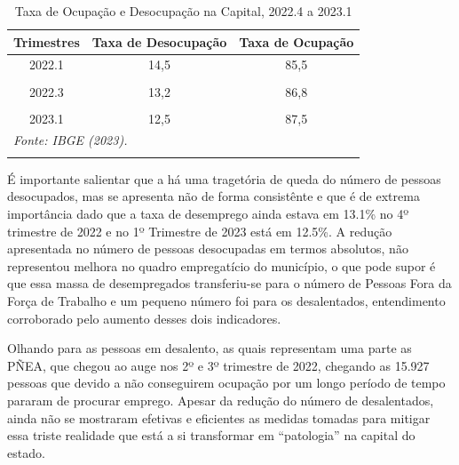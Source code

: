 \documentclass[
  12pt,
  a4paper,
]{article}
\begin{document}
\begin{longtable}[t]{ccc}
\caption{\label{tab:tab13}\label{tab13}Taxa de Ocupação e Desocupação na Capital, 2022.4 a 2023.1}\\
\toprule
Trimestres & Taxa de Desocupação & Taxa de Ocupação\\
\midrule
2022.1 & 14,5 & 85,5\\
\cellcolor[HTML]{DCDCDC}{2022.2} & \cellcolor[HTML]{DCDCDC}{13,2} & \cellcolor[HTML]{DCDCDC}{86,8}\\
2022.3 & 13,2 & 86,8\\
\cellcolor[HTML]{DCDCDC}{2022.4} & \cellcolor[HTML]{DCDCDC}{13,1} & \cellcolor[HTML]{DCDCDC}{86,9}\\
2023.1 & 12,5 & 87,5\\
\bottomrule
\multicolumn{3}{l}{\rule{0pt}{1em}\textit{Fonte: IBGE (2023).}}\\
\multicolumn{3}{l}{\rule{0pt}{1em}}\\
\end{longtable}
\endgroup{}

É importante salientar que a há uma tragetória de queda do número de
pessoas desocupados, mas se apresenta não de forma consistênte e que é
de extrema importância dado que a taxa de desemprego ainda estava em
13.1\% no 4º trimestre de 2022 e no 1º Trimestre de 2023 está em 12.5\%.
A redução apresentada no número de pessoas desocupadas em termos
absolutos, não representou melhora no quadro empregatício do município,
o que pode supor é que essa massa de desempregados transferiu-se para o
número de Pessoas Fora da Força de Trabalho e um pequeno número foi para
os desalentados, entendimento corroborado pelo aumento desses dois
indicadores.

Olhando para as pessoas em desalento, as quais representam uma parte as
PÑEA, que chegou ao auge nos 2º e 3º trimestre de 2022, chegando as
15.927 pessoas que devido a não conseguirem ocupação por um longo
período de tempo pararam de procurar emprego. Apesar da redução do
número de desalentados, ainda não se mostraram efetivas e eficientes as
medidas tomadas para mitigar essa triste realidade que está a si
transformar em ``patologia'' na capital do estado.

\begingroup\fontsize{9}{11}\selectfont
\end{document}

